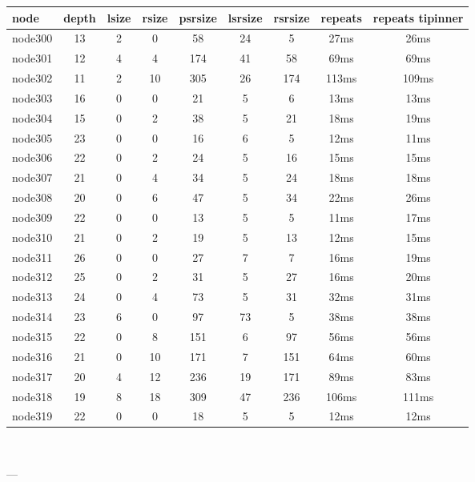 \begin{tabular}{|l|c|c|c|c|c|c|c|c|}
\hline node & depth & lsize & rsize & psrsize & lsrsize & rsrsize   & repeats & repeats tipinner\\
    \hline node300 & 13 & 2 & 0 & 58 & 24 & 5 & 27ms & 26ms\\
    \hline node301 & 12 & 4 & 4 & 174 & 41 & 58 & 69ms & 69ms\\
    \hline node302 & 11 & 2 & 10 & 305 & 26 & 174 & 113ms & 109ms\\
    \hline node303 & 16 & 0 & 0 & 21 & 5 & 6 & 13ms & 13ms\\
    \hline node304 & 15 & 0 & 2 & 38 & 5 & 21 & 18ms & 19ms\\
    \hline node305 & 23 & 0 & 0 & 16 & 6 & 5 & 12ms & 11ms\\
    \hline node306 & 22 & 0 & 2 & 24 & 5 & 16 & 15ms & 15ms\\
    \hline node307 & 21 & 0 & 4 & 34 & 5 & 24 & 18ms & 18ms\\
    \hline node308 & 20 & 0 & 6 & 47 & 5 & 34 & 22ms & 26ms\\
    \hline node309 & 22 & 0 & 0 & 13 & 5 & 5 & 11ms & 17ms\\
    \hline node310 & 21 & 0 & 2 & 19 & 5 & 13 & 12ms & 15ms\\
    \hline node311 & 26 & 0 & 0 & 27 & 7 & 7 & 16ms & 19ms\\
    \hline node312 & 25 & 0 & 2 & 31 & 5 & 27 & 16ms & 20ms\\
    \hline node313 & 24 & 0 & 4 & 73 & 5 & 31 & 32ms & 31ms\\
    \hline node314 & 23 & 6 & 0 & 97 & 73 & 5 & 38ms & 38ms\\
    \hline node315 & 22 & 0 & 8 & 151 & 6 & 97 & 56ms & 56ms\\
    \hline node316 & 21 & 0 & 10 & 171 & 7 & 151 & 64ms & 60ms\\
    \hline node317 & 20 & 4 & 12 & 236 & 19 & 171 & 89ms & 83ms\\
    \hline node318 & 19 & 8 & 18 & 309 & 47 & 236 & 106ms & 111ms\\
    \hline node319 & 22 & 0 & 0 & 18 & 5 & 5 & 12ms & 12ms\\

\hline
\end{tabular} \

---


